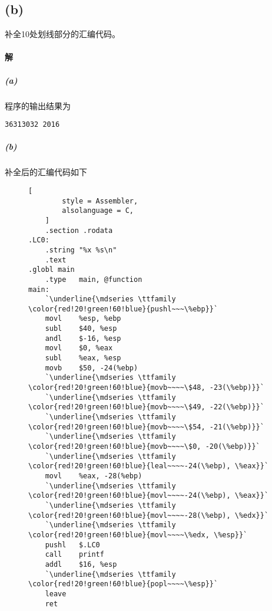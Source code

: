\documentclass{article}
\begin{document}
\subsection*{(b)}
补全10处划线部分的汇编代码。

\paragraph{解}
\subparagraph*{(a)}
程序的输出结果为
\begin{lstlisting}[style = C]
36313032 2016
\end{lstlisting}
\subparagraph*{(b)}
补全后的汇编代码如下
\begin{figure}[H]
    \centering
    \begin{lstlisting}[
        style = Assembler,
        alsolanguage = C,
    ]
    .section .rodata
.LC0:
    .string "%x %s\n"
    .text
.globl main
    .type   main, @function
main:
    `\underline{\mdseries \ttfamily \color{red!20!green!60!blue}{pushl~~~\%ebp}}`
    movl    %esp, %ebp
    subl    $40, %esp
    andl    $-16, %esp
    movl    $0, %eax
    subl    %eax, %esp
    movb    $50, -24(%ebp)
    `\underline{\mdseries \ttfamily \color{red!20!green!60!blue}{movb~~~~\$48, -23(\%ebp)}}`
    `\underline{\mdseries \ttfamily \color{red!20!green!60!blue}{movb~~~~\$49, -22(\%ebp)}}`
    `\underline{\mdseries \ttfamily \color{red!20!green!60!blue}{movb~~~~\$54, -21(\%ebp)}}`
    `\underline{\mdseries \ttfamily \color{red!20!green!60!blue}{movb~~~~\$0, -20(\%ebp)}}`
    `\underline{\mdseries \ttfamily \color{red!20!green!60!blue}{leal~~~~-24(\%ebp), \%eax}}`
    movl    %eax, -28(%ebp)
    `\underline{\mdseries \ttfamily \color{red!20!green!60!blue}{movl~~~~-24(\%ebp), \%eax}}`
    `\underline{\mdseries \ttfamily \color{red!20!green!60!blue}{movl~~~~-28(\%ebp), \%edx}}`
    `\underline{\mdseries \ttfamily \color{red!20!green!60!blue}{movl~~~~\%edx, \%esp}}`
    pushl   $.LC0
    call    printf
    addl    $16, %esp
    `\underline{\mdseries \ttfamily \color{red!20!green!60!blue}{popl~~~~\%esp}}`
    leave
    ret
    \end{lstlisting}
\end{figure}
\end{document}
